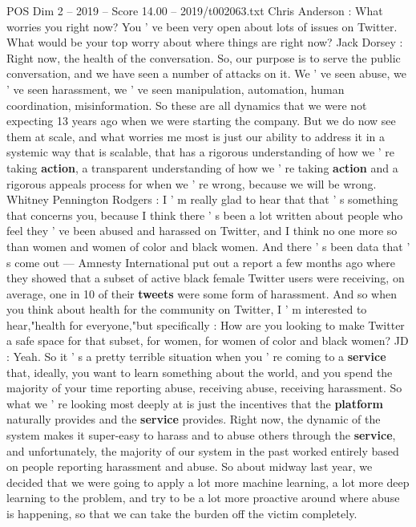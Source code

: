 \begin{textsample}{POS Dim 2 – 2019 – Score 14.00 – 2019/t002063.txt}  \label{ex:f2_pos_037}
Chris Anderson : What worries you right now?
You ' ve been very open about lots of issues on Twitter.
What would be your top worry about where things are right now?
Jack Dorsey : Right now, the health of the conversation.
So, our purpose is to serve the public conversation, and we have seen a number of attacks on it.
We ' ve seen abuse, we ' ve seen harassment, we ' ve seen manipulation, automation, human coordination, misinformation.
So these are all dynamics that we were not expecting 13 years ago when we were starting the company.
But we do now see them at scale, and what worries me most is just our ability to address it in a systemic way that is scalable, that has a rigorous understanding of how we ' re taking \textbf{action}, a transparent understanding of how we ' re taking \textbf{action} and a rigorous appeals process for when we ' re wrong, because we will be wrong.
Whitney Pennington Rodgers : I ' m really glad to hear that that ' s something that concerns you, because I think there ' s been a lot written about people who feel they ' ve been abused and harassed on Twitter, and I think no one more so than women and women of color and black women.
And there ' s been data that ' s come out — Amnesty International put out a report a few months ago where they showed that a subset of active black female Twitter users were receiving, on average, one in 10 of their \textbf{tweets} were some form of harassment.
And so when you think about health for the community on Twitter, I ' m interested to hear,"health for everyone,"but specifically : How are you looking to make Twitter a safe space for that subset, for women, for women of color and black women?
JD : Yeah.
So it ' s a pretty terrible situation when you ' re coming to a \textbf{service} that, ideally, you want to learn something about the world, and you spend the majority of your time reporting abuse, receiving abuse, receiving harassment.
So what we ' re looking most deeply at is just the incentives that the \textbf{platform} naturally provides and the \textbf{service} provides.
Right now, the dynamic of the system makes it super-easy to harass and to abuse others through the \textbf{service}, and unfortunately, the majority of our system in the past worked entirely based on people reporting harassment and abuse.
So about midway last year, we decided that we were going to apply a lot more machine learning, a lot more deep learning to the problem, and try to be a lot more proactive around where abuse is happening, so that we can take the burden off the victim completely.

\end{textsample}
